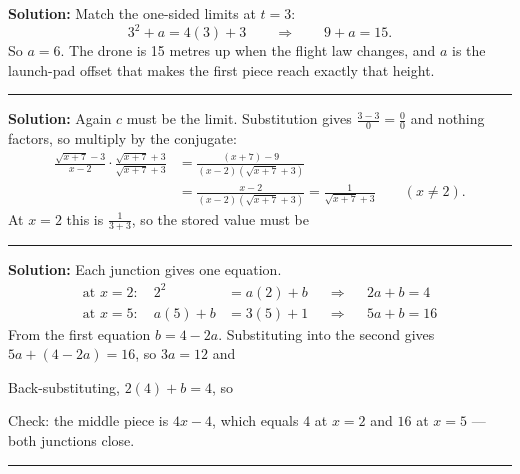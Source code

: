 \documentclass[12pt]{article}
\begin{document}
\textbf{Solution:} Match the one-sided limits at $t = 3$:
\[
  3^2 + a = 4(3) + 3 \qquad\Longrightarrow\qquad 9 + a = 15 .
\]
So $a = 6$. The drone is 15 metres up when the flight law changes, and $a$ is the
launch-pad offset that makes the first piece reach exactly that height.

\vspace{0.2cm}\noindent\rule{\linewidth}{0.2pt}\vspace{0.2cm}


\textbf{Solution:} Again $c$ must be the limit. Substitution gives
$\frac{3-3}{0} = \frac{0}{0}$ and nothing factors, so multiply by the conjugate:
\begin{align*}
  \frac{\sqrt{x+7}-3}{x-2}\cdot\frac{\sqrt{x+7}+3}{\sqrt{x+7}+3}
    &= \frac{(x+7) - 9}{(x-2)\left(\sqrt{x+7}+3\right)} \\[2pt]
    &= \frac{x-2}{(x-2)\left(\sqrt{x+7}+3\right)}
     = \frac{1}{\sqrt{x+7}+3} \qquad (x \neq 2).
\end{align*}
At $x = 2$ this is $\frac{1}{3+3}$, so the stored value must be

\vspace{0.2cm}\noindent\rule{\linewidth}{0.2pt}\vspace{0.2cm}


\textbf{Solution:} Each junction gives one equation.
\begin{align*}
  \text{at } x = 2: \quad 2^2 &= a(2) + b &&\Longrightarrow&& 2a + b = 4 \\
  \text{at } x = 5: \quad a(5) + b &= 3(5) + 1 &&\Longrightarrow&& 5a + b = 16
\end{align*}
From the first equation $b = 4 - 2a$. Substituting into the second gives
$5a + (4 - 2a) = 16$, so $3a = 12$ and 

Back-substituting, $2(4) + b = 4$, so 

Check: the middle piece is $4x - 4$, which equals $4$ at $x = 2$ and $16$ at
$x = 5$ --- both junctions close.

\vspace{0.2cm}\noindent\rule{\linewidth}{0.2pt}\vspace{0.2cm}
\end{document}
